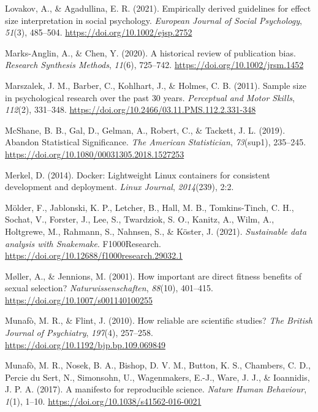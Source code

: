 \documentclass[
  12pt,
]{scrartcl}
\newlength{\cslhangindent}
\newenvironment{CSLReferences}[2] %
 {\begin{list}{}{%
  \setlength{\itemindent}{0pt}
  \setlength{\leftmargin}{0pt}
  \setlength{\parsep}{0pt}
  \ifodd #1
   \setlength{\leftmargin}{\cslhangindent}
   \setlength{\itemindent}{-1\cslhangindent}
  \fi
  \setlength{\itemsep}{#2\baselineskip}}}
 {\end{list}}
\begin{document}
\begin{CSLReferences}{1}{0}
Lovakov, A., \& Agadullina, E. R. (2021). Empirically derived guidelines
for effect size interpretation in social psychology. \emph{European
Journal of Social Psychology}, \emph{51}(3), 485--504.
\url{https://doi.org/10.1002/ejsp.2752}

Marks-Anglin, A., \& Chen, Y. (2020). A historical review of publication
bias. \emph{Research Synthesis Methods}, \emph{11}(6), 725--742.
\url{https://doi.org/10.1002/jrsm.1452}

Marszalek, J. M., Barber, C., Kohlhart, J., \& Holmes, C. B. (2011).
Sample size in psychological research over the past 30 years.
\emph{Perceptual and Motor Skills}, \emph{112}(2), 331--348.
\url{https://doi.org/10.2466/03.11.PMS.112.2.331-348}

McShane, B. B., Gal, D., Gelman, A., Robert, C., \& Tackett, J. L.
(2019). Abandon {Statistical} {Significance}. \emph{The American
Statistician}, \emph{73}(sup1), 235--245.
\url{https://doi.org/10.1080/00031305.2018.1527253}

Merkel, D. (2014). Docker: Lightweight {Linux} containers for consistent
development and deployment. \emph{Linux Journal}, \emph{2014}(239), 2:2.

Mölder, F., Jablonski, K. P., Letcher, B., Hall, M. B., Tomkins-Tinch,
C. H., Sochat, V., Forster, J., Lee, S., Twardziok, S. O., Kanitz, A.,
Wilm, A., Holtgrewe, M., Rahmann, S., Nahnsen, S., \& Köster, J. (2021).
\emph{Sustainable data analysis with {Snakemake}}. F1000Research.
\url{https://doi.org/10.12688/f1000research.29032.1}

Møller, A., \& Jennions, M. (2001). How important are direct fitness
benefits of sexual selection? \emph{Naturwissenschaften}, \emph{88}(10),
401--415. \url{https://doi.org/10.1007/s001140100255}

Munafò, M. R., \& Flint, J. (2010). How reliable are scientific studies?
\emph{The British Journal of Psychiatry}, \emph{197}(4), 257--258.
\url{https://doi.org/10.1192/bjp.bp.109.069849}

Munafò, M. R., Nosek, B. A., Bishop, D. V. M., Button, K. S., Chambers,
C. D., Percie du Sert, N., Simonsohn, U., Wagenmakers, E.-J., Ware, J.
J., \& Ioannidis, J. P. A. (2017). A manifesto for reproducible science.
\emph{Nature Human Behaviour}, \emph{1}(1), 1--10.
\url{https://doi.org/10.1038/s41562-016-0021}


\end{CSLReferences}
\end{document}
